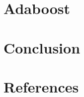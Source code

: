 \documentclass{acmtog} %
\begin{document}
\section{Adaboost}
\section{Conclusion}
\section{References}



\end{document}
